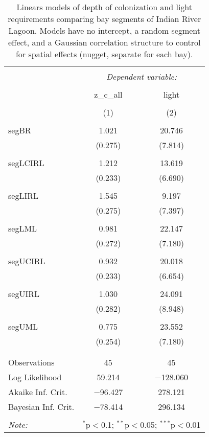 \documentclass[letterpaper,12pt]{article}\usepackage[]{graphicx}\usepackage[]{color}
\begin{document}
\begin{table}[!htbp] \centering 
  \caption{Linears models of depth of colonization and light requirements comparing bay segments of Indian River Lagoon.  Models have no intercept, a random segment effect, and a Gaussian correlation structure to control for spatial effects (nugget, separate for each bay).} 
  \label{} 
\begin{tabular}{@{\extracolsep{5pt}}lcc} 
\\[-1.8ex]\hline 
\hline \\[-1.8ex] 
 & \multicolumn{2}{c}{\textit{Dependent variable:}} \\ 
\cline{2-3} 
\\[-1.8ex] & z\_c\_all & light \\ 
\\[-1.8ex] & (1) & (2)\\ 
\hline \\[-1.8ex] 
 segBR & 1.021 & 20.746 \\ 
  & (0.275) & (7.814) \\ 
  & & \\ 
 segLCIRL & 1.212 & 13.619 \\ 
  & (0.233) & (6.690) \\ 
  & & \\ 
 segLIRL & 1.545 & 9.197 \\ 
  & (0.275) & (7.397) \\ 
  & & \\ 
 segLML & 0.981 & 22.147 \\ 
  & (0.272) & (7.180) \\ 
  & & \\ 
 segUCIRL & 0.932 & 20.018 \\ 
  & (0.233) & (6.654) \\ 
  & & \\ 
 segUIRL & 1.030 & 24.091 \\ 
  & (0.282) & (8.948) \\ 
  & & \\ 
 segUML & 0.775 & 23.552 \\ 
  & (0.254) & (7.180) \\ 
  & & \\ 
\hline \\[-1.8ex] 
Observations & 45 & 45 \\ 
Log Likelihood & 59.214 & $-$128.060 \\ 
Akaike Inf. Crit. & $-$96.427 & 278.121 \\ 
Bayesian Inf. Crit. & $-$78.414 & 296.134 \\ 
\hline 
\hline \\[-1.8ex] 
\textit{Note:}  & \multicolumn{2}{r}{$^{*}$p$<$0.1; $^{**}$p$<$0.05; $^{***}$p$<$0.01} \\ 
\end{tabular} 
\end{table} 
\end{document}
